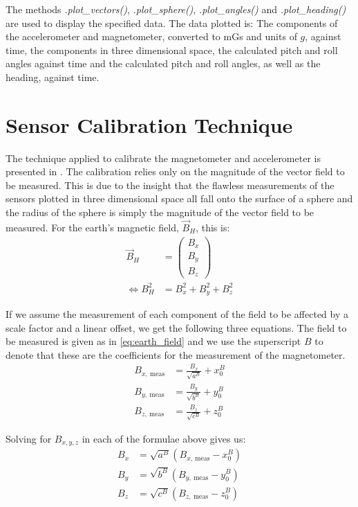 The methods \textit{.plot\_vectors()}, \textit{.plot\_sphere()}, \textit{.plot\_angles()} and \textit{.plot\_heading()} are used to display the specified data. The data plotted is: The components of the accelerometer and magnetometer, converted to mGs and units of $g$, against time, the components in three dimensional space, the calculated pitch and roll angles against time and the calculated pitch and roll angles, as well as the heading, against time.

\section{Sensor Calibration Technique \label{sec:meth:calibration_technique}}
The technique applied to calibrate the magnetometer and accelerometer is presented in \parencite{non-orthonogality}. The calibration relies only on the magnitude of the vector field to be measured. This is due to the insight that the flawless measurements of the sensors plotted in three dimensional space all fall onto the surface of a sphere and the radius of the sphere is simply the magnitude of the vector field to be measured. For the earth's magnetic field, $\vec{B}_H$, this is:
\begin{align}
    \vec{B}_H&=\begin{pmatrix} B_x \\ B_y \\ B_z \end{pmatrix} \label{eq:earth_field} \\
    \iff B_H^2& = B_x^2+B_y^2+B_z^2 
    \label{eq:regular_sphere}
\end{align}

If we assume the measurement of each component of the field to be affected by a scale factor and a linear offset, we get the following three equations. The field to be measured is given as in \eqref{eq:earth_field} and we use the superscript $B$ to denote that these are the coefficients for the measurement of the magnetometer.
\begin{align}
    B_{x,\ \mathrm{meas}} &= \frac{B_x}{\sqrt{a^B}}+x_0^B \\
    B_{y,\ \mathrm{meas}} &= \frac{B_y}{\sqrt{b^B}}+y_0^B \\
    B_{z,\ \mathrm{meas}} &= \frac{B_z}{\sqrt{c^B}}+z_0^B
\end{align}

Solving for $B_{x,y,z}$ in each of the formulae above gives us:
\begin{align}
    B_x&=\sqrt{a^B}(B_{x,\ \mathrm{meas}}-x_0^B) \label{eq:bx} \\
    B_y&=\sqrt{b^B}(B_{y,\ \mathrm{meas}}-y_0^B) \label{eq:by} \\
    B_z&=\sqrt{c^B}(B_{z,\ \mathrm{meas}}-z_0^B) \label{eq:bz}
\end{align}

